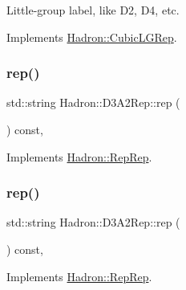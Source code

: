 Little-\/group label, like D2, D4, etc. 

Implements \mbox{\hyperlink{structHadron_1_1CubicLGRep_a9bdb14b519a611d21379ed96a3a9eb41}{Hadron\+::\+Cubic\+L\+G\+Rep}}.

\mbox{\label{structHadron_1_1D3A2Rep_a068031a95b51a3bb6b3219e51de41db2}} 
\subsubsection{\texorpdfstring{rep()}{rep()}\hspace{0.1cm}{\footnotesize\ttfamily [1/5]}}
{\footnotesize\ttfamily std\+::string Hadron\+::\+D3\+A2\+Rep\+::rep (\begin{DoxyParamCaption}{ }\end{DoxyParamCaption}) const\hspace{0.3cm}{\ttfamily [inline]}, {\ttfamily [virtual]}}



Implements \mbox{\hyperlink{structHadron_1_1RepRep_ab3213025f6de249f7095892109575fde}{Hadron\+::\+Rep\+Rep}}.

\mbox{\label{structHadron_1_1D3A2Rep_a068031a95b51a3bb6b3219e51de41db2}} 
\subsubsection{\texorpdfstring{rep()}{rep()}\hspace{0.1cm}{\footnotesize\ttfamily [2/5]}}
{\footnotesize\ttfamily std\+::string Hadron\+::\+D3\+A2\+Rep\+::rep (\begin{DoxyParamCaption}{ }\end{DoxyParamCaption}) const\hspace{0.3cm}{\ttfamily [inline]}, {\ttfamily [virtual]}}



Implements \mbox{\hyperlink{structHadron_1_1RepRep_ab3213025f6de249f7095892109575fde}{Hadron\+::\+Rep\+Rep}}.

\mbox{\label{structHadron_1_1D3A2Rep_a068031a95b51a3bb6b3219e51de41db2}} 
